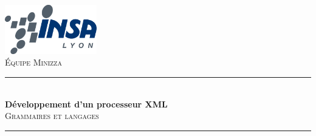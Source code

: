 \documentclass[a4paper]{report}
\title{\theTitre}
\author{\theAuteur}
\newcommand{\theTitre}{Développement d’un processeur XML}
\begin{document}
\begin{titlepage}



\newcommand{\HRule}{\rule{\linewidth}{0.5mm}} %

\center %


\includegraphics [width=40mm]{images/logo_INSA.png} \\[1.5cm]


\textsc{\large Équipe Minizza}\\[0.5cm] %





\HRule \\[0.4cm]
{ \huge \bfseries \theTitre}\\[0.4cm] %
\textsc{\Large Grammaires et langages}\\[0.5cm] %
\HRule \\[1.5cm]
 


\end{titlepage}
\end{document}
